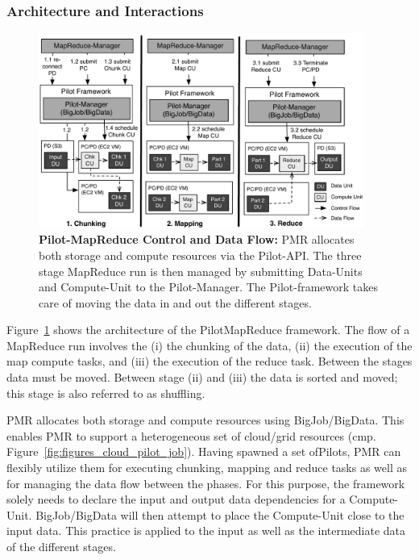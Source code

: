 \documentclass[times]{cpeauth}
\newcommand{\pilot}{Pilot\xspace}
\newcommand{\pilots}{Pilots\xspace}
\newcommand{\pilotmapreduce}{PilotMapReduce\xspace}
\newcommand{\computeunit}{Compute-Unit\xspace}
\newcommand{\dataunits}{Data-Units\xspace}
\begin{document}
\subsubsection*{Architecture and Interactions}

\begin{figure}[t]
	\centering
    \includegraphics[width=0.95\textwidth]{figures/pmr_clouds_flow.pdf}
    \caption{\textbf{Pilot-MapReduce Control and Data Flow:} PMR allocates 
     both storage and compute resources via the \pilot-API. The three stage 
    MapReduce run is then managed by submitting \dataunits and \computeunit to 
    the \pilot-Manager. The \pilot-framework takes care of moving the data in 
    and out the different stages.}
	\label{fig:figures_pmr_clouds}
\end{figure}

Figure~\ref{fig:figures_pmr_clouds} shows the architecture of the
\pilotmapreduce framework. The flow of a MapReduce run involves the (i) the 
chunking of the data, (ii) the execution of the map compute tasks, and (iii) 
the execution of the reduce task. Between the stages data must be moved. 
Between stage (ii) and (iii) the data is sorted and moved; this stage is also 
referred to as shuffling.

PMR allocates both storage and compute resources
using BigJob/BigData. This enables PMR to support a heterogeneous set of
cloud/grid resources (cmp. Figure~\ref{fig:figures_cloud_pilot_job}). Having
spawned a set of\pilots, PMR can flexibly utilize them for executing chunking,
mapping and reduce tasks as well as for managing the data flow between the
phases. For this purpose, the framework solely needs to declare the input and
output data dependencies for a \computeunit. BigJob/BigData will then attempt
to place the \computeunit close to the input data. This practice is applied to
the input as well as the intermediate data of the different stages.
\end{document}

